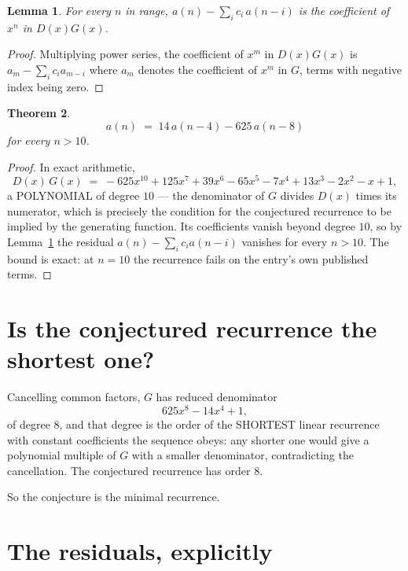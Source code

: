 \documentclass[11pt,a4paper]{article}
\theoremstyle{plain}
\newtheorem{theorem}{Theorem}
\newtheorem{lemma}[theorem]{Lemma}
\theoremstyle{definition}
\begin{document}
\begin{lemma}\label{lem:key}
For every $n$ in range, $a(n)-\sum_i c_i\,a(n-i)$ is the coefficient of $x^{n}$ in
$D(x)G(x)$.
\end{lemma}

\begin{proof}
Multiplying power series, the coefficient of $x^{m}$ in $D(x)G(x)$ is
$a_m-\sum_i c_i a_{m-i}$ where $a_m$ denotes the coefficient of $x^{m}$ in $G$, terms with
negative index being zero.
\end{proof}

\begin{theorem}
\[
a(n)\;=\;14\,a(n-4) - 625\,a(n-8)
\]
for every $n>10$.
\end{theorem}

\begin{proof}
In exact arithmetic,
\[
D(x)\,G(x)\;=\;- 625 x^{10} + 125 x^{7} + 39 x^{6} - 65 x^{5} - 7 x^{4} + 13 x^{3} - 2 x^{2} - x + 1,
\]
a POLYNOMIAL of degree $10$ --- the denominator of $G$ divides $D(x)$ times its numerator,
which is precisely the condition for the conjectured recurrence to be implied by the
generating function. Its coefficients vanish beyond degree $10$, so by
Lemma~\ref{lem:key} the residual $a(n)-\sum_ic_ia(n-i)$ vanishes for every
$n>10$. The bound is exact: at $n=10$ the recurrence fails on the entry's own published terms.
\end{proof}

\section{Is the conjectured recurrence the shortest one?}

Cancelling common factors, $G$ has reduced denominator
\[
625 x^{8} - 14 x^{4} + 1,
\]
of degree $8$, and that degree is the order of the SHORTEST linear recurrence with
constant coefficients the sequence obeys: any shorter one would give a polynomial multiple of
$G$ with a smaller denominator, contradicting the cancellation. The conjectured recurrence has
order $8$.

So the conjecture is the minimal recurrence.

\section{The residuals, explicitly}
\end{document}
